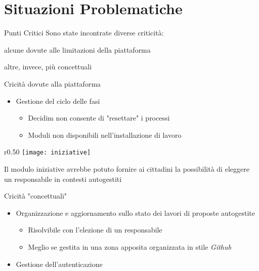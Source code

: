 \section{Situazioni Problematiche}

\begin{frame}{Punti Critici}
  Sono state incontrate diverse criticità:

  alcune dovute alle limitazioni della piattaforma

  altre, invece, più concettuali
\end{frame}
\begin{frame}{Cricità dovute alla piattaforma}
  \begin{itemize}[<+- | alert@+>]
    \item{Gestione del ciclo delle fasi}
          \begin{itemize}
            \item Decidim non consente di "resettare" i processi
            \item Moduli non disponibili nell'installazione di lavoro
          \end{itemize}
  \end{itemize}
\end{frame}
\begin{frame}{}
  \begin{wrapfigure}{r}{0.50\textwidth}
    \centering
    \texttt{[image: iniziative]}
  \end{wrapfigure}
  Il modulo iniziative avrebbe potuto fornire ai cittadini la possibilità di eleggere un responsabile in contesti autogestiti
\end{frame}
\begin{frame}{Cricità "concettuali"}
  \begin{itemize}[<+- | alert@+>]
    \item Organizzazione e aggiornamento sullo stato dei lavori di proposte autogestite
          \begin{itemize}
            \item Risolvibile con l'elezione di un responsabile
            \item Meglio se gestita in una zona apposita organizzata in stile \emph{Github}
          \end{itemize}


    \item Gestione dell'autenticazione
  \end{itemize}

\end{frame}
